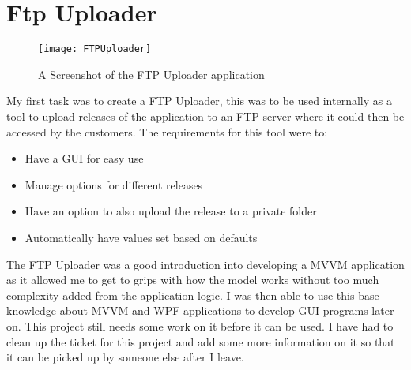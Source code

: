 \section{Ftp Uploader}{
	\begin{figure}
		\centering
		\texttt{[image: FTPUploader]}
		\caption{A Screenshot of the FTP Uploader application}
		\label{fig:FtpUploader}
	\end{figure}
	My first task was to create a FTP Uploader, this was to be used internally as a tool to upload releases of the application to an FTP server where it could then be accessed by the customers. The requirements for this tool were to:
	\begin{itemize}
		\item{Have a GUI for easy use}
		\item{Manage options for different releases}
		\item{Have an option to also upload the release to a private folder}
		\item{Automatically have values set based on defaults}
	\end{itemize} 
	The FTP Uploader was a good introduction into developing a MVVM application as it allowed me to get to grips with how the model works without too much complexity added from the application logic. I was then able to use this base knowledge about MVVM and WPF applications to develop GUI programs later on. This project still needs some work on it before it can be used. I have had to clean up the ticket for this project and add some more information on it so that it can be picked up by someone else after I leave.
}